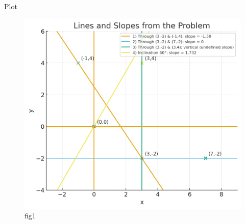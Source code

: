 \documentclass{beamer}
\begin{document}
\begin{frame}{Plot}
 \begin{figure}[H]
     \centering
     \includegraphics[width=0.5\linewidth]{figs/fig1.png}
     \caption{fig1}
     \label{fig:placeholder}
 \end{figure}
     
    
\end{frame}
\end{document}
